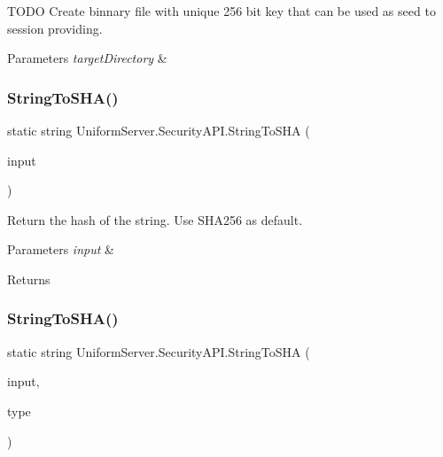 T\+O\+DO Create binnary file with unique 256 bit key that can be used as seed to session providing. 


\begin{DoxyParams}{Parameters}
{\em target\+Directory} & \\
\hline
\end{DoxyParams}
\mbox{\label{class_uniform_server_1_1_security_a_p_i_a45566f4aed87cbfabbcf00b7fca118db}} 
\subsubsection{\texorpdfstring{String\+To\+S\+H\+A()}{StringToSHA()}\hspace{0.1cm}{\footnotesize\ttfamily [1/2]}}
{\footnotesize\ttfamily static string Uniform\+Server.\+Security\+A\+P\+I.\+String\+To\+S\+HA (\begin{DoxyParamCaption}\item[{string}]{input }\end{DoxyParamCaption})\hspace{0.3cm}{\ttfamily [static]}}



Return the hash of the string. Use S\+H\+A256 as default. 


\begin{DoxyParams}{Parameters}
{\em input} & \\
\hline
\end{DoxyParams}
\begin{DoxyReturn}{Returns}

\end{DoxyReturn}
\mbox{\label{class_uniform_server_1_1_security_a_p_i_a417561751e136d3c7d1fdeab5cbcd18d}} 
\subsubsection{\texorpdfstring{String\+To\+S\+H\+A()}{StringToSHA()}\hspace{0.1cm}{\footnotesize\ttfamily [2/2]}}
{\footnotesize\ttfamily static string Uniform\+Server.\+Security\+A\+P\+I.\+String\+To\+S\+HA (\begin{DoxyParamCaption}\item[{string}]{input,  }\item[{\mbox{\hyperlink{class_uniform_server_1_1_security_a_p_i_a0013616bf69cff8555e697c0c4960240}{S\+H\+A\+Types}}}]{type }\end{DoxyParamCaption})\hspace{0.3cm}{\ttfamily [static]}}



